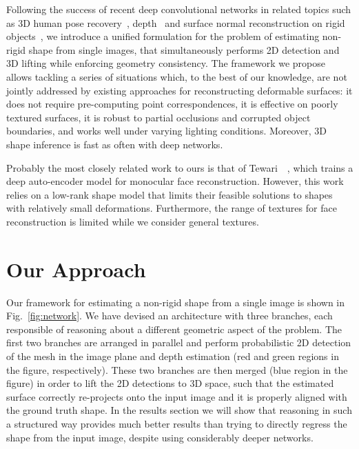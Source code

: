 \documentclass[10pt,twocolumn,letterpaper]{article}
\begin{document}
Following the success of recent deep convolutional networks in related topics such as 3D human pose recovery~\cite{martinez2017simple,moreno20163d,pavlakos2016coarse}, depth~\cite{eigen2015predicting,eigen2014depth,garg2016unsupervised,liu2016learning,roy2016monocular,xu2017multi} and surface normal reconstruction on rigid objects~\cite{bansal2017pixelnet,bansal2016marr,eigen2015predicting,wang2015designing}, we introduce a unified formulation for the problem of estimating non-rigid shape from single images, that simultaneously performs 2D detection and 3D lifting while enforcing geometry consistency. The framework we propose allows tackling a series of situations which, to the best of our knowledge, are not jointly addressed by existing approaches for reconstructing deformable surfaces: it does not require pre-computing point correspondences, it is effective on poorly textured surfaces, it is robust to partial occlusions and corrupted object boundaries, and works well under varying lighting conditions. Moreover, 3D shape inference is fast as often with deep networks.

Probably the most closely related work to ours is that of Tewari~\etal~\cite{tewari2017mofa}, which trains a deep auto-encoder model for monocular face reconstruction. However, this work relies on a low-rank shape model that limits their feasible solutions to shapes with relatively small   deformations. Furthermore, the range of textures for face reconstruction is limited while we consider general textures.


\section{Our Approach}

Our framework for estimating a non-rigid shape from a single image is shown in Fig.~\ref{fig:network}. We have devised an architecture with three  branches, each responsible of reasoning about a different geometric aspect of the problem. The first two branches are arranged in parallel and perform probabilistic 2D detection of the mesh in the image plane and depth estimation (red and green regions in the figure, respectively). These two branches are then merged (blue region in the figure) in order to lift the 2D detections to 3D space, such that the estimated surface correctly re-projects onto the input image and it is properly aligned with the ground truth shape. In the results section we will show that reasoning in such a structured way provides much better results than trying to directly regress the shape from the input image, despite using considerably deeper networks. 
\end{document}
